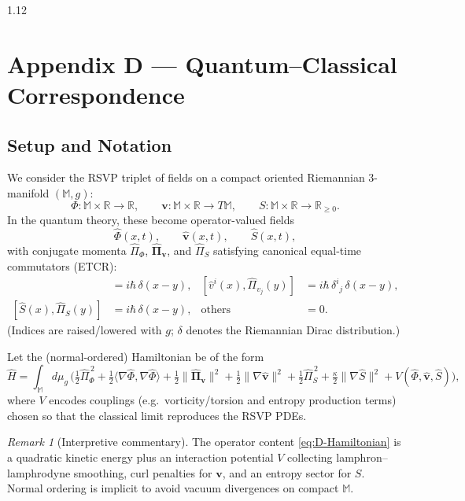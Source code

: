\documentclass[12pt,a4paper]{article}
\numberwithin{equation}{section}
\theoremstyle{remark}
\newtheorem{remark}{Remark}[section]
\theoremstyle{definition}
\begin{document}
\begin{spacing}{1.12}
\section{Appendix D — Quantum--Classical Correspondence}

\subsection{Setup and Notation}\label{sec:D-setup}

We consider the RSVP triplet of fields on a compact oriented Riemannian 3-manifold $(\mathbb{M}, g)$:
\[
\Phi:\mathbb{M}\times\mathbb{R}\to\mathbb{R},\qquad
\mathbf{v}:\mathbb{M}\times\mathbb{R}\to T\mathbb{M},\qquad
S:\mathbb{M}\times\mathbb{R}\to \mathbb{R}_{\ge 0}.
\]
In the quantum theory, these become operator-valued fields
\[
\hat{\Phi}(x,t),\qquad \hat{\mathbf{v}}(x,t),\qquad \hat{S}(x,t),
\]
with conjugate momenta $\hat{\Pi}_\Phi$, $\hat{\bm{\Pi}}_{\!\mathbf{v}}$, and $\hat{\Pi}_S$ satisfying canonical equal-time commutators (ETCR):
\begin{align}
[\hat{\Phi}(x),\hat{\Pi}_\Phi(y)]&= i\hbar\,\delta(x-y), &
[\hat{v}^i(x),\hat{\Pi}_{v_j}(y)]&= i\hbar\,\delta^i{}_j\,\delta(x-y), \nonumber\\
[\hat{S}(x),\hat{\Pi}_S(y)]&= i\hbar\,\delta(x-y), &
\text{others} &= 0. \label{eq:D-ETCR}
\end{align}
(Indices are raised/lowered with $g$; $\delta$ denotes the Riemannian Dirac distribution.)

Let the (normal-ordered) Hamiltonian be of the form
\begin{equation}\label{eq:D-Hamiltonian}
\hat{H}\!=\!\int_{\mathbb{M}}\!\! d\mu_g\,\Big(\tfrac12\hat{\Pi}_{\Phi}^{\,2}
+\tfrac12\langle\nabla \hat{\Phi},\nabla \hat{\Phi}\rangle
+\tfrac12\|\hat{\bm{\Pi}}_{\!\mathbf{v}}\|^2
+\tfrac12\|\nabla \hat{\mathbf{v}}\|^2
+\tfrac12\hat{\Pi}_{S}^{\,2}
+\tfrac{\kappa}{2}\|\nabla \hat{S}\|^2
+ V(\hat{\Phi},\hat{\mathbf{v}},\hat{S})\Big),
\end{equation}
where $V$ encodes couplings (e.g.\ vorticity/torsion and entropy production terms) chosen so that the classical limit reproduces the RSVP PDEs.

\begin{remark}[Interpretive commentary]
The operator content \eqref{eq:D-Hamiltonian} is a quadratic kinetic energy plus an interaction potential $V$ collecting lamphron--lamphrodyne smoothing, curl penalties for $\mathbf{v}$, and an entropy sector for $S$. Normal ordering is implicit to avoid vacuum divergences on compact $\mathbb{M}$.
\end{remark}


\end{spacing}
\end{document}
